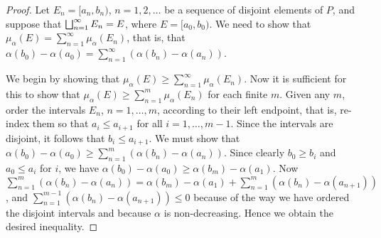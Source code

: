 \begin{proof}
Let $E_n=[a_n, b_n)$, $n=1,2,\dots$ be a sequence of disjoint elements of $P$, and suppose that $\bigsqcup_{n=1}^\infty E_n=E$, where $E=[a_0, b_0)$. We need to show that $\mu_\alpha(E)=\sum_{n=1}^\infty\mu_\alpha(E_n)$, that is, that $\alpha(b_0)-\alpha(a_0)=\sum_{n=1}^\infty(\alpha(b_n)-\alpha(a_n))$.

We begin by showing that $\mu_\alpha(E)\geq\sum_{n=1}^\infty\mu_\alpha(E_n)$. Now it is sufficient for this to show that $\mu_\alpha(E)\geq\sum_{n=1}^m\mu_\alpha(E_n)$ for each finite $m$. Given any $m$, order the intervals $E_n$, $n=1,\dots,m$, according to their left endpoint, that is, re-index them so that $a_i\leq a_{i+1}$ for all $i=1,\dots,m-1$. Since the intervals are disjoint, it follows that $b_i\leq a_{i+1}$. We must show that $\alpha(b_0)-\alpha(a_0)\geq\sum_{n=1}^m(\alpha(b_n)-\alpha(a_n))$. Since clearly $b_0\geq b_i$ and $a_0\leq a_i$ for $i$, we have $\alpha(b_0)-\alpha(a_0)\geq\alpha(b_m)-\alpha(a_1)$. Now $\sum_{n=1}^m(\alpha(b_n)-\alpha(a_n))=\alpha(b_m)-\alpha(a_1)+\sum_{n=1}^m(\alpha(b_n)-\alpha(a_{n+1}))$, and $\sum_{n=1}^{m-1}(\alpha(b_n)-\alpha(a_{n+1}))\leq0$ because of the way we have ordered the disjoint intervals and because $\alpha$ is non-decreasing. Hence we obtain the desired inequality.


\end{proof}
